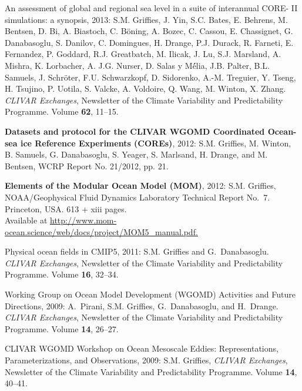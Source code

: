\begin{etaremune}
\item An assessment of global and regional sea level in a suite of interannual CORE- II simulations: a synopsis, 2013:  S.M. Grif\/f\/ies, J. Yin, S.C. Bates, E. Behrens, M.  Bentsen, D. Bi, A. Biastoch, C. B\"{o}ning, A. Bozec, C. Cassou, E. Chassignet, G. Danabasoglu, S. Danilov, C. Domingues, H. Drange, P.J. Durack, R. Farneti, E. Fernandez, P. Goddard, R.J. Greatbatch, M. Ilicak, J. Lu, S.J. Marsland, A. Mishra, K. Lorbacher, A. J.G. Nurser, D. Salas y M\'{é}lia, J.B. Palter, B.L. Samuels, J. Schr\"{o}ter, F.U. Schwarzkopf, D. Sidorenko, A.-M. Treguier, Y. Tseng, H. Tsujino, P.  Uotila, S. Valcke, A. Voldoire, Q. Wang, M. Winton, X. Zhang. {\em CLIVAR Exchanges}, Newsletter of the Climate Variability and Predictability Programme. Volume {\bf 62}, 11--15.

\item {\bf Datasets and protocol for the CLIVAR WGOMD Coordinated Ocean-sea ice Reference Experiments (COREs)}, 2012: S.M. Grif\/f\/ies, M. Winton, B. Samuels, G. Danabasoglu, S. Yeager, S. Marlsand, H.  Drange, and M. Bentsen, WCRP Report No. 21/2012, pp. 21.

\item {\bf Elements of the Modular Ocean Model (MOM)}, 2012: S.M. Grif\/f\/ies, NOAA/Geophysical Fluid Dynamics Laboratory Technical Report No.\ 7. Princeton, USA.  613 + xiii pages. \\
  Available at 
  \href{http://www.mom-ocean.science/web/docs/project/MOM5_manual.pdf}{http://www.mom-ocean.science/web/docs/project/MOM5\_manual.pdf.}

\item Physical ocean fields in CMIP5, 2011:  S.M. Grif\/f\/ies and G.\ Danabasoglu. {\em CLIVAR Exchanges}, Newsletter of the Climate Variability and Predictability Programme.  Volume {\bf 16}, 32--34.

\item Working Group on Ocean Model Development (WGOMD) Activities and Future Directions, 2009: A.\ Pirani, S.M. Grif\/f\/ies, G.\ Danabasoglu, and H.\ Drange.  {\em CLIVAR Exchanges}, Newsletter of the Climate Variability and Predictability Programme.  Volume {\bf 14}, 26--27.

\item CLIVAR WGOMD Workshop on Ocean Mesoscale Eddies:
  Representations, Parameterizations, and Observations, 2009: S.M. Grif\/f\/ies, {\em CLIVAR Exchanges}, Newsletter of the Climate Variability and Predictability Programme.  Volume {\bf 14}, 40--41.


\end{etaremune}
